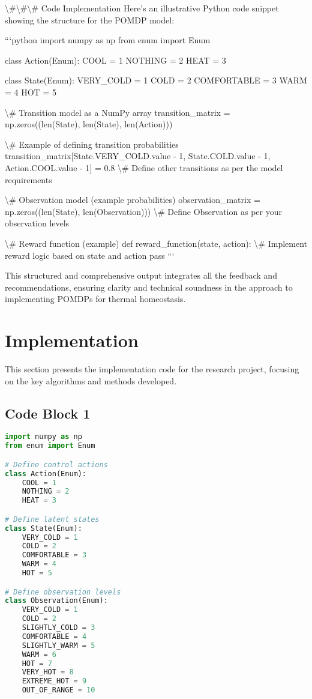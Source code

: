\documentclass[11pt,a4paper]{article}
\begin{document}
\textbackslash{}#\textbackslash{}#\textbackslash{}# Code Implementation
Here's an illustrative Python code snippet showing the structure for the POMDP model:

```python
import numpy as np
from enum import Enum

class Action(Enum):
    COOL = 1
    NOTHING = 2
    HEAT = 3

class State(Enum):
    VERY_COLD = 1
    COLD = 2
    COMFORTABLE = 3
    WARM = 4
    HOT = 5

\textbackslash{}# Transition model as a NumPy array
transition_matrix = np.zeros((len(State), len(State), len(Action)))

\textbackslash{}# Example of defining transition probabilities
transition_matrix[State.VERY_COLD.value - 1, State.COLD.value - 1, Action.COOL.value - 1] = 0.8
\textbackslash{}# Define other transitions as per the model requirements

\textbackslash{}# Observation model (example probabilities)
observation_matrix = np.zeros((len(State), len(Observation)))  \textbackslash{}# Define Observation as per your observation levels

\textbackslash{}# Reward function (example)
def reward_function(state, action):
    \textbackslash{}# Implement reward logic based on state and action
    pass
```

This structured and comprehensive output integrates all the feedback and recommendations, ensuring clarity and technical soundness in the approach to implementing POMDPs for thermal homeostasis.
\section{Implementation}

This section presents the implementation code for the research project, focusing on the key algorithms and methods developed.


\subsection{Code Block 1}

\begin{lstlisting}[language=Python, caption={Implementation code for the POMDP with Active Inference}]
import numpy as np
from enum import Enum

# Define control actions
class Action(Enum):
    COOL = 1
    NOTHING = 2
    HEAT = 3

# Define latent states
class State(Enum):
    VERY_COLD = 1
    COLD = 2
    COMFORTABLE = 3
    WARM = 4
    HOT = 5

# Define observation levels
class Observation(Enum):
    VERY_COLD = 1
    COLD = 2
    SLIGHTLY_COLD = 3
    COMFORTABLE = 4
    SLIGHTLY_WARM = 5
    WARM = 6
    HOT = 7
    VERY_HOT = 8
    EXTREME_HOT = 9
    OUT_OF_RANGE = 10
\end{lstlisting}
\end{document}
